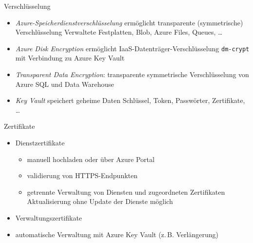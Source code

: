 
\begin{flashcard}[\ ]{Verschlüsselung}
    \begin{itemize}
        \item \emph{Azure-Speicherdienstverschlüsselung} ermöglicht transparente (symmetrische) Verschlüsselung\newline
            Verwaltete Festplatten, Blob, Azure Files, Queues, \ldots
        \item \emph{Azure Disk Encryption} ermöglicht IaaS-Datenträger-Verschlüsselung\newline
            \texttt{dm-crypt} mit Verbindung zu Azure Key Vault
        \item \emph{Transparent Data Encryption}: transparente symmetrische Verschlüsselung von Azure SQL und Data Warehouse
        \item \emph{Key Vault} speichert geheime Daten\newline
            Schlüssel, Token, Passwörter, Zertifikate, \ldots
    \end{itemize}
\end{flashcard}

\begin{flashcard}[\ ]{Zertifikate}
    \begin{itemize}
        \item Dienstzertifikate
        \begin{itemize}
            \item manuell hochladen oder über Azure Portal
            \item validierung von HTTPS-Endpunkten
            \item getrennte Verwaltung von Diensten und zugeordneten Zertifikaten\newline
            Aktualisierung ohne Update der Dienste möglich
        \end{itemize}
        \item Verwaltungszertifikate
        \item automatische Verwaltung mit Azure Key Vault (z.\,B. Verlängerung)
    \end{itemize}

\end{flashcard}


